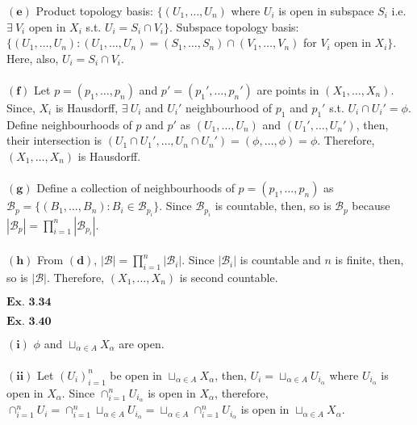 \documentclass{article}
\begin{document}
$\mathbf{(e)}$ Product topology basis: $\{(U_1,\ldots,U_n)$ where $U_i$ is open in subspace $S_i$ i.e. $\exists\ V_i$ open in $X_i$ s.t. $U_i = S_i \cap V_i\}$. Subspace topology basis: $\{(U_1,\ldots,U_n): (U_1,\ldots,U_n) = (S_1,\ldots,S_n)\cap(V_1,\ldots,V_n)$ for $V_i$ open in $X_i\}$. Here, also, $U_i = S_i \cap V_i$.\\~\\

$\mathbf{(f)}$ Let $p=(p_1,\ldots,p_n)$ and $p'=(p_1',\ldots,p_n')$ are points in $(X_1,\ldots,X_n)$. Since, $X_i$ is Hausdorff, $\exists\ U_i$ and $U_i'$ neighbourhood of $p_1$ and $p_1'$ s.t. $U_i \cap U_i' = \phi$. Define neighbourhoods of $p$ and $p'$ as $(U_1,\ldots,U_n)$ and $(U_1',\ldots,U_n')$, then, their intersection is $(U_1\cap U_1',\ldots,U_n\cap U_n') = (\phi,\ldots,\phi) = \phi$. Therefore, $(X_1,\ldots,X_n)$ is Hausdorff.\\~\\

$\mathbf{(g)}$ Define a collection of neighbourhoods of $p=(p_1,\ldots,p_n)$ as $\mathcal{B}_{p} = \{(B_1,\ldots,B_n): B_i \in \mathcal{B}_{p_i}\}$. Since $\mathcal{B}_{p_i}$ is countable, then, so is $\mathcal{B}_{p}$ because $|\mathcal{B}_p| = \prod_{i=1}^{n}|\mathcal{B}_{p_i}|$.\\~\\

$\mathbf{(h)}$ From $\mathbf{(d)}$, $|\mathcal{B}| = \prod_{i=1}^{n}|\mathcal{B}_i|$. Since $|\mathcal{B}_i|$ is countable and $n$ is finite, then, so is $|\mathcal{B}|$. Therefore, $(X_1,\ldots,X_n)$ is second countable.

\vspace{0.2in}

${\textbf{Ex. 3.34}}$


\vspace{0.2in}

${\textbf{Ex. 3.40}}$

$\mathbf{(i)}$ $\phi$ and $\sqcup_{\alpha \in A}X_{\alpha}$ are open.\\~\\

$\mathbf{(ii)}$ Let $(U_i)_{i=1}^{n}$ be open in $\sqcup_{\alpha \in A}X_{\alpha}$, then, $U_i = \sqcup_{\alpha \in A}U_{i_\alpha}$ where $U_{i_\alpha}$ is open in $X_{\alpha}$. Since $\cap_{i=1}^{n}U_{i_\alpha}$ is open in $X_{\alpha}$, therefore, $\cap_{i=1}^{n}U_i = \cap_{i=1}^{n}\sqcup_{\alpha \in A}U_{i_\alpha} = \sqcup_{\alpha \in A}\cap_{i=1}^{n}U_{i_\alpha}$ is open in $\sqcup_{\alpha \in A}X_{\alpha}$.\\~\\
\end{document}
